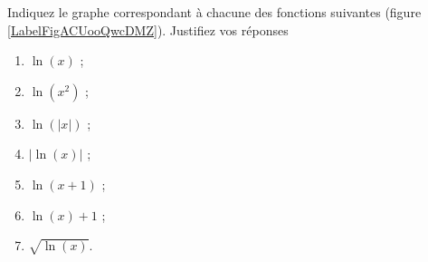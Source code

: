 
\begin{exercice}\label{exoDS2010-1-0002}

	Indiquez le graphe correspondant à chacune des fonctions suivantes (figure \ref{LabelFigACUooQwcDMZ}). Justifiez vos réponses
\begin{multicols}{3}
  \begin{enumerate}
  \item $\ln(x)$ ;
  \item $\ln(x^2)$ ;
  \item $\ln(|x|)$ ;
  \item $|\ln(x)|$ ;
  \item $\ln(x+1)$ ;
  \item $\ln(x)+1$ ;
  \item $\sqrt{\ln(x)}$.
  \end{enumerate}
\end{multicols}

%

\newcommand{\CaptionFigACUooQwcDMZ}{Les graphes à considérer de la question \ref{exoDS2010-1-0002}.}


\end{exercice}
